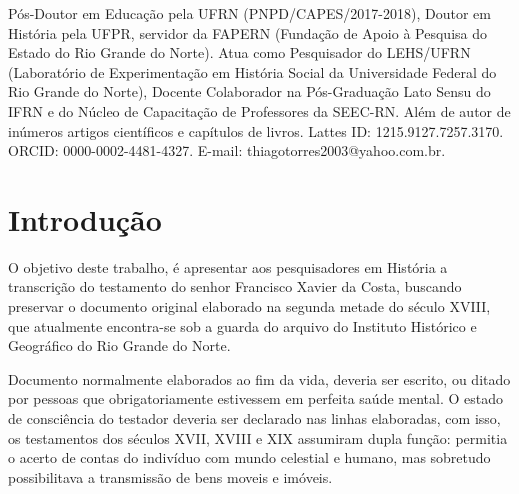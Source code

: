 \begin{refsection}
    \renewcommand{\thefigure}{\arabic{figure}}

    \label{chap:historia-vida-sertoes}
    
    {Pós-Doutor em Educação pela UFRN (PNPD/CAPES/2017-2018), Doutor em História pela UFPR, servidor da FAPERN (Fundação de Apoio à Pesquisa do Estado do Rio Grande do Norte). Atua como Pesquisador do LEHS/UFRN (Laboratório de Experimentação em História Social da Universidade Federal do Rio Grande do Norte), Docente Colaborador na Pós-Graduação Lato Sensu do IFRN e do Núcleo de Capacitação de Professores da SEEC-RN. Além de autor de inúmeros artigos científicos e capítulos de livros. Lattes ID: 1215.9127.7257.3170. ORCID: 0000-0002-4481-4327. E-mail: thiagotorres2003@yahoo.com.br.}

    \section{Introdução}

    O objetivo   deste trabalho, é apresentar aos pesquisadores em História a transcrição do testamento do senhor Francisco Xavier da Costa, buscando preservar o documento original elaborado na segunda metade do século XVIII, que atualmente encontra-se sob a guarda do arquivo do Instituto Histórico e Geográfico do Rio Grande do Norte.

    Documento normalmente elaborados ao fim da vida, deveria ser escrito, ou ditado por pessoas que obrigatoriamente estivessem em perfeita saúde mental. O estado de consciência do testador deveria ser declarado nas linhas elaboradas, com isso, os testamentos dos séculos XVII, XVIII e XIX assumiram dupla função: permitia o acerto de contas do indivíduo com mundo celestial e humano, mas sobretudo possibilitava a transmissão de bens moveis e imóveis. 


\end{refsection}
